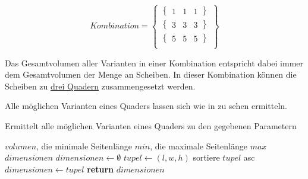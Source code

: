 \documentclass[a4paper,10pt,ngerman]{scrartcl}
\begin{document}
    \[
        Kombination = \begin{Bmatrix}
                          \begin{Bmatrix}
                              1 & 1 & 1
                          \end{Bmatrix} \\
                          \begin{Bmatrix}
                              3 & 3 & 3
                          \end{Bmatrix} \\
                          \begin{Bmatrix}
                              5 & 5 & 5
                          \end{Bmatrix} \\
        \end{Bmatrix}
    \]

    Das Gesamtvolumen aller Varianten in einer Kombination entspricht dabei immer dem Gesamtvolumen der Menge an Scheiben.
    In dieser Kombination können die Scheiben zu \hyperref[fig:figAB4]{drei Quadern} zusammengesetzt werden.

    Alle möglichen Varianten eines Quaders lassen sich wie in \hyperref[alg:euclid2]{} zu sehen ermitteln.

    \begin{algorithm}[H]
        \caption{Ermittelt alle möglichen Varianten eines Quaders zu den gegebenen Parametern}
        \label{alg:euclid2}
        \begin{algorithmic}[1]
            \Require $volumen$, die minimale Seitenlänge $min$, die maximale Seitenlänge $max$
            \Ensure $dimensionen$
                \State $dimensionen \gets \emptyset$
                                \State $tupel \gets (l, w, h)$
                                \State sortiere $tupel$ asc
                                \State $dimensionen \gets tupel$
                            \EndIf
                        \EndFor
                    \EndFor
                \EndFor
                \State \textbf{return} $dimensionen$
            \EndFunction
        \end{algorithmic}
    \end{algorithm}
\end{document}
